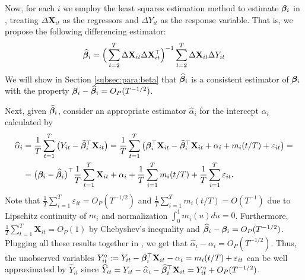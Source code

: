 \documentclass[a4paper,12pt]{article}
\makeatletter
\renewcommand{\eqref}[1]{\tagform@{\ref{#1}}}
\makeatother
\begin{document}
Now, for each $i$ we employ the least squares estimation method to estimate $\bm{\beta}_i$ in \eqref{model_with_regs}, treating $\Delta \mathbf{X}_{it}$ as the regressors and $\Delta Y_{it}$ as the response variable. That is, we propose the following differencing estimator:
\begin{align}\label{eq:beta:est}
\widehat{\bm{\beta}}_i = \Big( \sum_{t=2}^T \Delta \mathbf{X}_{it} \Delta \mathbf{X}_{it}^\top \Big)^{-1} \sum_{t=2}^T \Delta \mathbf{X}_{it} \Delta Y_{it}
\end{align}
We will show in Section \ref{subsec:para:beta} that $\widehat{\bm{\beta}}_i$ is a consistent estimator of $\bm{\beta}_i$ with the property $\bm{\beta}_i - \widehat{\bm{\beta}}_i = O_P(T^{-1/2})$.

Next, given $\widehat{\bm{\beta}}_i$, consider an appropriate estimator $\widehat{\alpha}_{i}$ for the intercept $\alpha_i$ calculated by
\begin{align}\label{eq:alpha:est}
\widehat{\alpha}_i &= \frac{1}{T}\sum_{t=1}^T \big(Y_{it} - \widehat{\bm{\beta}}_i^\top \mathbf{X}_{it}\big) = \frac{1}{T}\sum_{t=1}^T \big(\bm{\beta}_i^\top \mathbf{X}_{it} - \widehat{\bm{\beta}}_i^\top \mathbf{X}_{it} + \alpha_i + m_i(t/T) + \varepsilon_{it}\big) =\\
&= \big(\bm{\beta}_i - \widehat{\bm{\beta}}_i \big)^\top\frac{1}{T}\sum_{t=1}^T  \mathbf{X}_{it} + \alpha_i + \frac{1}{T}\sum_{i=1}^T m_i(t/T) + \frac{1}{T}\sum_{i=1}^T \varepsilon_{it}.\nonumber
\end{align}
Note that $\frac{1}{T}\sum_{i=1}^T \varepsilon_{it} = O_P(T^{-1/2})$ and $\frac{1}{T}\sum_{i=1}^T m_i(t/T) = O(T^{-1})$ due to Lipschitz continuity of $m_i$ and normalization $\int_{0}^1 m_i(u)du = 0$. Furthermore, $\frac{1}{T}\sum_{t=1}^T  \mathbf{X}_{it} = O_P(1)$ by Chebyshev's inequality and $\widehat{\bm{\beta}}_i - \bm{\beta}_i = O_P (T^{-1/2})$. Plugging all these results together in \eqref{alpha-est}, we get that $\widehat{\alpha}_i - \alpha_i = O_P(T^{-1/2})$. Thus, the unobserved variables \linebreak $Y_{it}^\circ := Y_{it} - \bm{\beta}_i^\top \mathbf{X}_{it} - \alpha_i = m_i(t/T) + \varepsilon_{it}$ can be well approximated by $\widehat{Y}_{it} $ since \linebreak $\widehat{Y}_{it} = Y_{it} -\widehat{\alpha}_i - \widehat{\bm{\beta}}_i^\top \mathbf{X}_{it} = Y_{it}^\circ + O_P(T^{-1/2})$.
\end{document}
